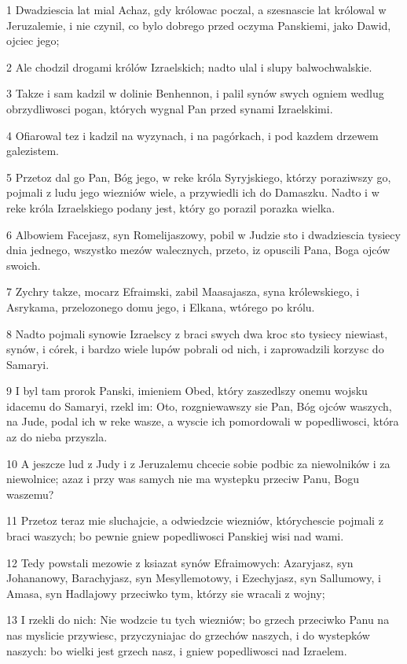 \par 1 Dwadziescia lat mial Achaz, gdy królowac poczal, a szesnascie lat królowal w Jeruzalemie, i nie czynil, co bylo dobrego przed oczyma Panskiemi, jako Dawid, ojciec jego;
\par 2 Ale chodzil drogami królów Izraelskich; nadto ulal i slupy balwochwalskie.
\par 3 Takze i sam kadzil w dolinie Benhennon, i palil synów swych ogniem wedlug obrzydliwosci pogan, których wygnal Pan przed synami Izraelskimi.
\par 4 Ofiarowal tez i kadzil na wyzynach, i na pagórkach, i pod kazdem drzewem galezistem.
\par 5 Przetoz dal go Pan, Bóg jego, w reke króla Syryjskiego, którzy poraziwszy go, pojmali z ludu jego wiezniów wiele, a przywiedli ich do Damaszku. Nadto i w reke króla Izraelskiego podany jest, który go porazil porazka wielka.
\par 6 Albowiem Facejasz, syn Romelijaszowy, pobil w Judzie sto i dwadziescia tysiecy dnia jednego, wszystko mezów walecznych, przeto, iz opuscili Pana, Boga ojców swoich.
\par 7 Zychry takze, mocarz Efraimski, zabil Maasajasza, syna królewskiego, i Asrykama, przelozonego domu jego, i Elkana, wtórego po królu.
\par 8 Nadto pojmali synowie Izraelscy z braci swych dwa kroc sto tysiecy niewiast, synów, i córek, i bardzo wiele lupów pobrali od nich, i zaprowadzili korzysc do Samaryi.
\par 9 I byl tam prorok Panski, imieniem Obed, który zaszedlszy onemu wojsku idacemu do Samaryi, rzekl im: Oto, rozgniewawszy sie Pan, Bóg ojców waszych, na Jude, podal ich w reke wasze, a wyscie ich pomordowali w popedliwosci, która az do nieba przyszla.
\par 10 A jeszcze lud z Judy i z Jeruzalemu chcecie sobie podbic za niewolników i za niewolnice; azaz i przy was samych nie ma wystepku przeciw Panu, Bogu waszemu?
\par 11 Przetoz teraz mie sluchajcie, a odwiedzcie wiezniów, którychescie pojmali z braci waszych; bo pewnie gniew popedliwosci Panskiej wisi nad wami.
\par 12 Tedy powstali mezowie z ksiazat synów Efraimowych: Azaryjasz, syn Johananowy, Barachyjasz, syn Mesyllemotowy, i Ezechyjasz, syn Sallumowy, i Amasa, syn Hadlajowy przeciwko tym, którzy sie wracali z wojny;
\par 13 I rzekli do nich: Nie wodzcie tu tych wiezniów; bo grzech przeciwko Panu na nas myslicie przywiesc, przyczyniajac do grzechów naszych, i do wystepków naszych: bo wielki jest grzech nasz, i gniew popedliwosci nad Izraelem.

